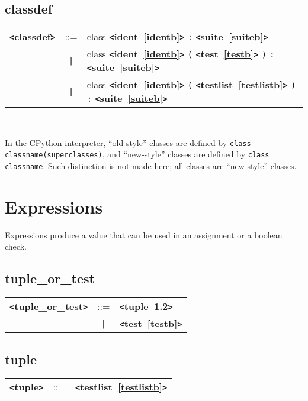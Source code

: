 \documentclass[12pt]{article}
\begin{document}
\subsection{classdef}
\label{classdefb}
\begin{tabular}{lcl}
{\bf \verb+<+classdef\verb+>+} & ::=  & class {\bf \verb+<+ident~\ref{identb}\verb+>+}  \verb|:| {\bf \verb+<+suite~\ref{suiteb}\verb+>+}  \\
 & \verb+|+  & class {\bf \verb+<+ident~\ref{identb}\verb+>+}  \verb|(| {\bf \verb+<+test~\ref{testb}\verb+>+}  \verb|)| \verb|:| {\bf \verb+<+suite~\ref{suiteb}\verb+>+}  \\
 & \verb+|+  & class {\bf \verb+<+ident~\ref{identb}\verb+>+}  \verb|(| {\bf \verb+<+testlist~\ref{testlistb}\verb+>+}  \verb|)| \verb|:| {\bf \verb+<+suite~\ref{suiteb}\verb+>+}  \\
\end{tabular} \\


In the CPython interpreter, ``old-style'' classes are defined by
\verb+class classname(superclasses)+, and ``new-style'' classes are defined by 
\verb+class classname+.  Such distinction is not made here; all classes
are ``new-style'' classes.

\section{Expressions}
Expressions produce a value that can be used in an assignment or a boolean check.

\subsection{tuple\_or\_test}
\label{tuplezzzorzzztestb}
\begin{tabular}{lcl}
{\bf \verb+<+tuple\_or\_test\verb+>+} & ::=  & {\bf \verb+<+tuple~\ref{tupleb}\verb+>+}  \\
 & \verb+|+  & {\bf \verb+<+test~\ref{testb}\verb+>+}  \\
\end{tabular}

\subsection{tuple}
\label{tupleb}
\begin{tabular}{lcl}
{\bf \verb+<+tuple\verb+>+} & ::=  & {\bf \verb+<+testlist~\ref{testlistb}\verb+>+}  \\
\end{tabular} \\
\end{document}
